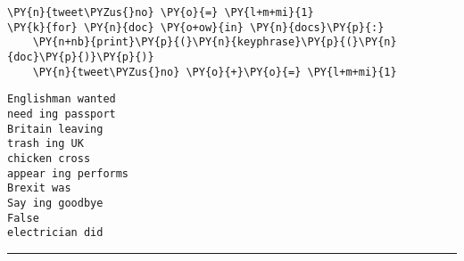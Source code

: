     \begin{tcolorbox}[breakable, size=fbox, boxrule=1pt, pad at break*=1mm,colback=cellbackground, colframe=cellborder]
\begin{Verbatim}[commandchars=\\\{\}]
\PY{n}{tweet\PYZus{}no} \PY{o}{=} \PY{l+m+mi}{1}
\PY{k}{for} \PY{n}{doc} \PY{o+ow}{in} \PY{n}{docs}\PY{p}{:}
    \PY{n+nb}{print}\PY{p}{(}\PY{n}{keyphrase}\PY{p}{(}\PY{n}{doc}\PY{p}{)}\PY{p}{)}
    \PY{n}{tweet\PYZus{}no} \PY{o}{+}\PY{o}{=} \PY{l+m+mi}{1}
\end{Verbatim}
\end{tcolorbox}

    \begin{Verbatim}[commandchars=\\\{\}]
Englishman wanted
need ing passport
Britain leaving
trash ing UK
chicken cross
appear ing performs
Brexit was
Say ing goodbye
False
electrician did
    \end{Verbatim}

    \begin{center}\rule{0.5\linewidth}{0.5pt}\end{center}



